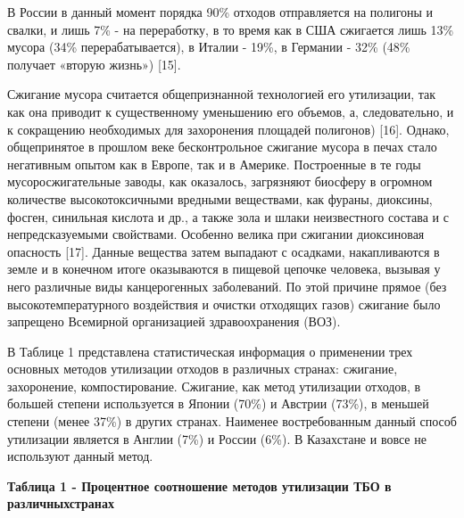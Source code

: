 В России в данный момент порядка 90\% отходов отправляется на полигоны и
свалки, и лишь 7\% - на переработку, в то время как в США сжигается лишь
13\% мусора (34\% перерабатывается), в Италии - 19\%, в Германии - 32\%
(48\% получает «вторую жизнь») {[}15{]}.

Сжигание мусора считается общепризнанной технологией его утилизации, так
как она приводит к существенному уменьшению его объемов, а,
следовательно, и к сокращению необходимых для захоронения площадей
полигонов) {[}16{]}. Однако, общепринятое в прошлом веке бесконтрольное
сжигание мусора в печах стало негативным опытом как в Европе, так и в
Америке. Построенные в те годы мусоросжигательные заводы, как оказалось,
загрязняют биосферу в огромном количестве высокотоксичными вредными
веществами, как фураны, диоксины, фосген, синильная кислота и др., а
также зола и шлаки неизвестного состава и с непредсказуемыми свойствами.
Особенно велика при сжигании диоксиновая опасность {[}17{]}. Данные
вещества затем выпадают с осадками, накапливаются в земле и в конечном
итоге оказываются в пищевой цепочке человека, вызывая у него различные
виды канцерогенных заболеваний. По этой причине прямое (без
высокотемпературного воздействия и очистки отходящих газов) сжигание
было запрещено Всемирной организацией здравоохранения (ВОЗ).

В Таблице 1 представлена статистическая информация о применении трех
основных методов утилизации отходов в различных странах: сжигание,
захоронение, компостирование. Сжигание, как метод утилизации отходов, в
большей степени используется в Японии (70\%) и Австрии (73\%), в меньшей
степени (менее 37\%) в других странах. Наименее востребованным данный
способ утилизации является в Англии (7\%) и России (6\%). В Казахстане и
вовсе не используют данный метод.

{\bfseries Таблица 1 - Процентное соотношение методов утилизации ТБО в
различныхстранах}

